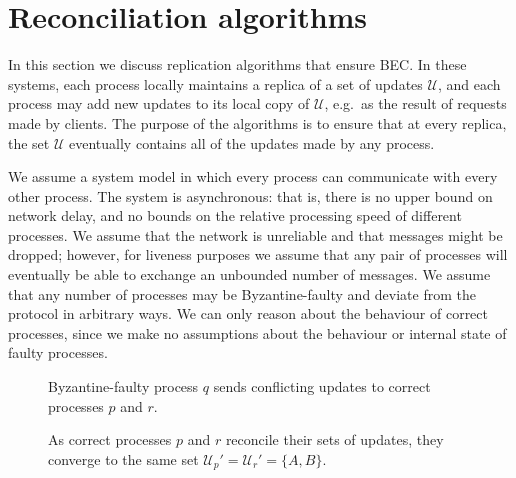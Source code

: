 \documentclass[a4paper,anonymous,USenglish]{lipics-v2019}
\begin{document}
\section{Reconciliation algorithms}\label{sec:algorithm}


In this section we discuss replication algorithms that ensure BEC.
In these systems, each process locally maintains a replica of a set of updates $\mathcal{U}$, and each process may add new updates to its local copy of $\mathcal{U}$, e.g.\ as the result of requests made by clients.
The purpose of the algorithms is to ensure that at every replica, the set $\mathcal{U}$ eventually contains all of the updates made by any process.

We assume a system model in which every process can communicate with every other process.
The system is asynchronous: that is, there is no upper bound on network delay, and no bounds on the relative processing speed of different processes.
We assume that the network is unreliable and that messages might be dropped; however, for liveness purposes we assume that any pair of processes will eventually be able to exchange an unbounded number of messages.
We assume that any number of processes may be Byzantine-faulty and deviate from the protocol in arbitrary ways.
We can only reason about the behaviour of correct processes, since we make no assumptions about the behaviour or internal state of faulty processes.

\begin{figure}
    \centering
    
    \caption{Byzantine-faulty process $q$ sends conflicting updates to correct processes $p$ and $r$.}
    \label{fig:trivial1}
\end{figure}

\begin{figure}
    \centering
    
    \caption{As correct processes $p$ and $r$ reconcile their sets of updates, they converge to the same set $\mathcal{U}_p' = \mathcal{U}_r' = \{A,B\}$.}
    \label{fig:trivial2}
\end{figure}
\end{document}
